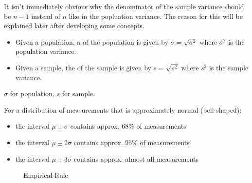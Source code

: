 \begin{rmrk}
    It isn't immediately obvious why the denominator of the sample variance should be $n-1$ instead of $n$ like in the popluation variance. The reason for this will be explained later after developing some concepts.
\end{rmrk}

\begin{nota}
\end{nota}

\begin{defn}
    \begin{itemize}
        \item Given a population, a  of the population is given by $\sigma = \sqrt{\sigma^{2}}$ where $\sigma^{2}$ is the population variance.
        \item Given a sample, the  of the sample is given by $s = \sqrt{s^{2}}$ where $s^{2}$ is the sample variance.
    \end{itemize}
\end{defn}

\begin{nota}
    $\sigma$ for population, $s$ for sample.
\end{nota}

\begin{note}
    For a distribution of measurements that is approximately normal (bell-shaped):
    \begin{itemize}
        \item the interval $\mu \pm \sigma$ contains approx. $68\%$ of measurements
        \item the interval $\mu \pm 2\sigma$ contains approx. $95\%$ of measurements
        \item the interval $\mu \pm 3\sigma$ contains approx. almost all measurements
    \end{itemize}

    \begin{figure}[h]
        \vspace{-40pt}
        \centering
        
        \vspace{-40pt}
        \caption{Empirical Rule}
        \label{fig:emprule}
    \end{figure}
\end{note}

